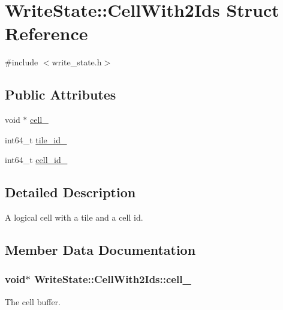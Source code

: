 \hypertarget{structWriteState_1_1CellWith2Ids}{}\section{Write\+State\+:\+:Cell\+With2\+Ids Struct Reference}
\label{structWriteState_1_1CellWith2Ids}


{\ttfamily \#include $<$write\+\_\+state.\+h$>$}

\subsection*{Public Attributes}
\begin{DoxyCompactItemize}
\item 
void $\ast$ \hyperlink{structWriteState_1_1CellWith2Ids_a16bfdf1f646b5ec93d00e7a0f5768ddb}{cell\+\_\+}
\item 
int64\+\_\+t \hyperlink{structWriteState_1_1CellWith2Ids_a8f1fc12280b0a6fea8d5298f99599d58}{tile\+\_\+id\+\_\+}
\item 
int64\+\_\+t \hyperlink{structWriteState_1_1CellWith2Ids_ac3726ff7485d0a1d8a3050235a6e44a2}{cell\+\_\+id\+\_\+}
\end{DoxyCompactItemize}


\subsection{Detailed Description}
A logical cell with a tile and a cell id. 

\subsection{Member Data Documentation}
\hypertarget{structWriteState_1_1CellWith2Ids_a16bfdf1f646b5ec93d00e7a0f5768ddb}{}
\subsubsection[{cell\+\_\+}]{\setlength{\rightskip}{0pt plus 5cm}void$\ast$ Write\+State\+::\+Cell\+With2\+Ids\+::cell\+\_\+}\label{structWriteState_1_1CellWith2Ids_a16bfdf1f646b5ec93d00e7a0f5768ddb}
The cell buffer. \hypertarget{structWriteState_1_1CellWith2Ids_ac3726ff7485d0a1d8a3050235a6e44a2}{}
